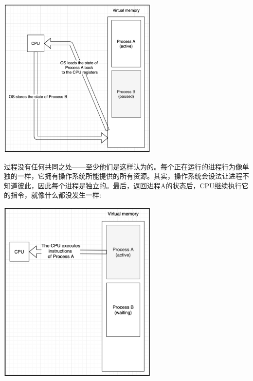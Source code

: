 \begin{center}
	\includegraphics[width=0.6\textwidth]{content/Section-2/Chapter-8/6}
\end{center}

过程没有任何共同之处——至少他们是这样认为的。每个正在运行的进程行为像单独的一样，它拥有操作系统所能提供的所有资源。其实，操作系统会设法让进程不知道彼此，因此每个进程是独立的。最后，返回进程A的状态后，CPU继续执行它的指令，就像什么都没发生一样: \par

\begin{center}
	\includegraphics[width=0.6\textwidth]{content/Section-2/Chapter-8/7}
\end{center}

